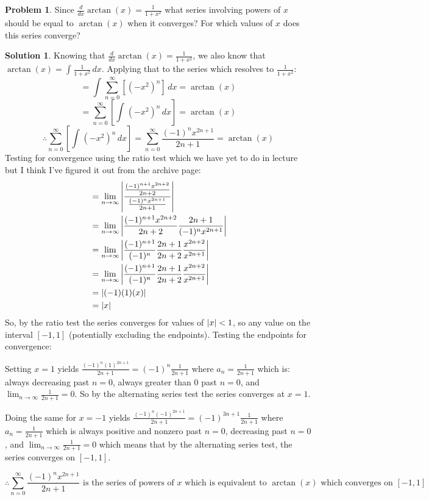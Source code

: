 \documentclass[10pt]{article}
\theoremstyle{definition}
\newtheorem{problem}{Problem}
\newtheorem{soln}{Solution}
\begin{document}
\begin{problem}
Since $\frac{d}{dx} \arctan(x) = \frac{1}{1+x^2}$ what series involving powers of $x$ should be equal to $\arctan(x)$ when it converges? For which values of $x$ does this series converge?
\end{problem}
\begin{soln} Knowing that $\frac{d}{dx} \arctan(x) = \frac{1}{1+x^2}$, we also know that $\arctan(x) = \int_{}^{} \frac{1}{1+x^2} \,dx$. Applying that to the series which resolves to $\frac{1}{1+x^2}$:
    $$= \int_{}^{} \sum_{n = 0}^{\infty} \left[(-x^2)^n\right] \,dx = \arctan(x)$$
    $$= \sum_{n = 0}^{\infty} \left[\int_{}^{} (-x^2)^n \,dx\right] = \arctan(x)$$
    $$\therefore \sum_{n = 0}^{\infty} \left[\int_{}^{} (-x^2)^n \,dx\right] = \sum_{n = 0}^{\infty} \frac{(-1)^nx^{2n+1}}{2n + 1} = \arctan(x)$$
    \noindent Testing for convergence using the ratio test which we have yet to do in lecture but I think I've figured it out from the archive page:
    \begin{align*}
         & = \lim_{n \to \infty} \abs{\frac{\frac{(-1)^{n+1}x^{2n+2}}{2n+2}}{\frac{(-1)^{n}x^{2n+1}}{2n+1}}} \\
         & = \lim_{n \to \infty} \abs{\frac{(-1)^{n+1}x^{2n+2}}{2n+2} \frac{2n+1}{(-1)^{n}x^{2n+1}}}         \\
         & = \lim_{n \to \infty} \abs{\frac{(-1)^{n+1}}{(-1)^{n}}\frac{2n+1}{2n+2}\frac{x^{2n+2}}{x^{2n+1}}} \\
         & = \lim_{n \to \infty} \abs{\frac{(-1)^{n+1}}{(-1)^{n}}\frac{2n+1}{2n+2}\frac{x^{2n+2}}{x^{2n+1}}} \\
         & = \abs{(-1)(1)(x)}                                                                                \\
         & = \abs{x}                                                                                         \\
    \end{align*}
    \noindent So, by the ratio test the series converges for values of $\abs{x}<1$, so any value on the interval $[-1,1]$ (potentially excluding the endpoints). Testing the endpoints for convergence:

    Setting $x=1$ yields $\frac{(-1)^n(1)^{2n+1}}{2n + 1}= (-1)^n\frac{1}{2n + 1}$ where $a_n=\frac{1}{2n + 1}$ which is: always decreasing past $n=0$, always greater than $0$ past $n=0$, and $\lim_{n \to \infty} \frac{1}{2n + 1} = 0$.
    So by the alternating series test the series converges at $x=1$.

    Doing the same for $x=-1$ yields $\frac{(-1)^n(-1)^{2n+1}}{2n + 1} = (-1)^{3n+1}\frac{1}{2n + 1}$ where $a_n=\frac{1}{2n + 1}$ which is always positive and nonzero past $n=0$,
    decreasing past $n=0$, and $\lim_{n \to \infty} \frac{1}{2n + 1} = 0$ which means that by the alternating series test, the series converges on $[-1,1]$.

    $$\therefore \sum_{n = 0}^{\infty} \frac{(-1)^nx^{2n+1}}{2n + 1} \text{ is the series of powers of } x \text{ which is equivalent to } \arctan(x) \text { which converges on } [-1,1] $$
\end{soln}
\end{document}
